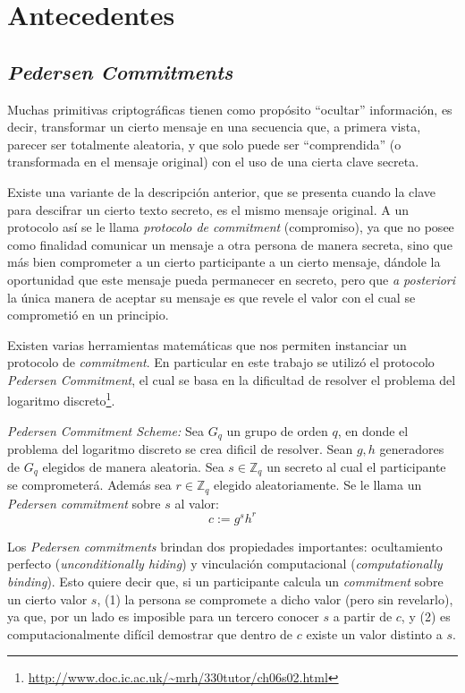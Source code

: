 \chapter{Antecedentes}
\section{\emph{Pedersen Commitments}}

Muchas primitivas criptográficas tienen como propósito ``ocultar'' información, es decir, transformar un cierto mensaje en una 
secuencia que, a primera vista, parecer ser totalmente aleatoria, y que solo puede ser ``comprendida'' (o transformada en el 
mensaje original) con el uso de una cierta clave secreta.

Existe una variante de la descripción anterior, que se presenta cuando la clave para descifrar un cierto texto secreto, es el 
mismo mensaje original. A un protocolo así se le llama \emph{protocolo de commitment} (compromiso), ya que no posee como finalidad 
comunicar un mensaje a otra persona de manera secreta, sino que más bien comprometer a un cierto participante a un cierto mensaje, 
dándole la oportunidad que este mensaje pueda permanecer en secreto, pero que \emph{a posteriori} la única manera de aceptar su 
mensaje es que revele el valor con el cual se comprometió en un principio.


Existen varias herramientas matemáticas que nos permiten instanciar un protocolo de \emph{commitment}. En particular en este 
trabajo se utilizó el protocolo \emph{Pedersen Commitment}\cite{pedersen1991non}, el cual se basa en la dificultad de resolver el 
problema del logaritmo discreto\footnote{\url{http://www.doc.ic.ac.uk/~mrh/330tutor/ch06s02.html}}.

\emph{Pedersen Commitment Scheme:} Sea $G_q$ un grupo de orden $q$, en donde el problema del logaritmo discreto se crea dificil 
de resolver. Sean $g,h$ generadores de $G_q$ elegidos de manera aleatoria. Sea $s \in \mathbb{Z}_q$ un secreto al cual el 
participante se comprometerá. Además sea $r \in \mathbb{Z}_q$ elegido aleatoriamente. Se le llama un \emph{Pedersen commitment} 
sobre $s$ al valor: $$c := g^s h^r$$

Los \emph{Pedersen commitments} brindan dos propiedades importantes: 
  ocultamiento perfecto (\emph{unconditionally hiding}) y 
  vinculación computacional (\emph{computationally binding}). 
Esto quiere decir que, si un participante calcula un \emph{commitment} sobre un 
  cierto valor $s$, 
  (1) la persona se compromete a dicho valor (pero sin revelarlo), ya que, 
  por un lado es imposible para un tercero conocer $s$ a partir de $c$, 
  y (2) es computacionalmente difícil demostrar que dentro de $c$ existe un valor distinto a $s$.

